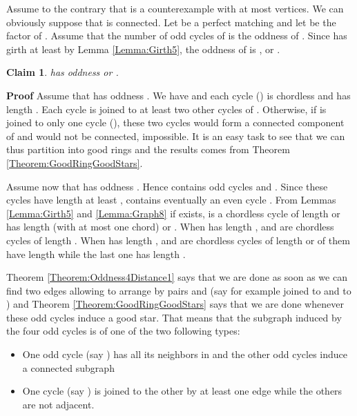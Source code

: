 \documentclass{elsart}
\theoremstyle{plain} \theoremheaderfont{\scshape}
\newtheorem{Clm}{Claim}[Thm]
\newenvironment{Prf}{{\bf \noindent Proof } }{\hfill\\}
\newenvironment{PrfClaim}{{\bf Proof }}{{\hfill\tiny{\\}}}
\begin{document}
\begin{Prf}
Assume to the contrary that  is a counterexample with at most
 vertices. We can obviously suppose that  is connected. Let
 be a perfect matching and let  be the factor of
. Assume that the number of odd cycles of  is the
oddness of .  Since  has girth at least  by Lemma
\ref{Lemma:Girth5}, the oddness of  is ,  or .
\begin{Clm} \label{Claim:Claim1MinimummCounterExample32}
 has oddness  or .
\end{Clm}
\begin{PrfClaim} Assume  that  has oddness . We have
 and each cycle  () is chordless and has length . Each cycle  is
joined to at least two other cycles of . Otherwise, if
 is joined to only one cycle  (), these two
cycles would form a connected component of  and   would not be
connected, impossible. It is an easy task to see that we can thus
partition   into good rings and the results comes from
Theorem \ref{Theorem:GoodRingGoodStars}.
\end{PrfClaim}

Assume now that  has oddness . Hence  contains 
odd cycles  and . Since these cycles have length
at least ,  contains eventually an even cycle .
From Lemmas \ref{Lemma:Girth5} and  \ref{Lemma:Graph8}
 if  exists,   is a chordless cycle of length  or  has length
 (with at most one chord) or . When  has length ,
 and  are chordless cycles of length . When
 has length ,  and  are chordless cycles
of length  or  of them have length  while the last one has
length .




Theorem \ref{Theorem:Oddness4Distance1} says that we are done as
soon as we can  find two edges allowing to arrange by pairs
 and   (say for example  joined to  and
 to )  and Theorem \ref{Theorem:GoodRingGoodStars} says
that we are done whenever these  odd cycles induce a good star.
That means that the subgraph  induced  by the four odd cycles is
of one of the two following types:

\begin{itemize}
  \item [Type 1]One odd cycle (say ) has all its neighbors in  and the 
other odd cycles induce a connected subgraph
  \item [Type 2] One cycle (say
) is joined to the other by at least one edge while the others
are not adjacent.
\end{itemize}


\end{Prf}
\end{document}
